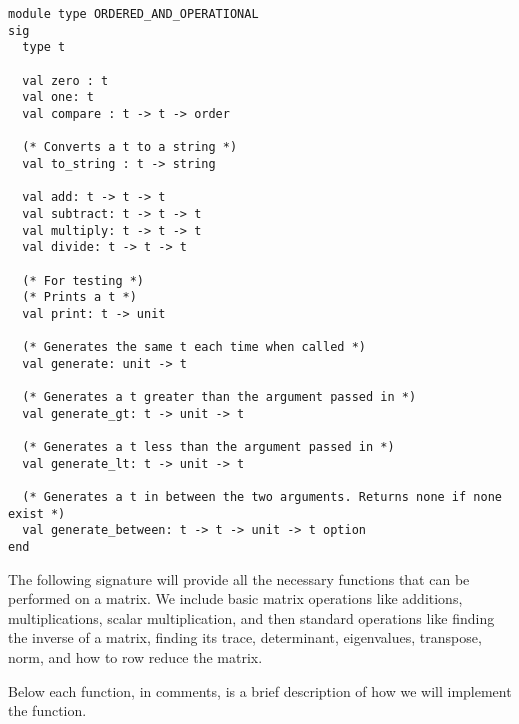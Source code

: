 \documentclass[letterpaper,11pt]{article}
\begin{document}
\begin{verbatim}
module type ORDERED_AND_OPERATIONAL
sig
  type t

  val zero : t
  val one: t
  val compare : t -> t -> order

  (* Converts a t to a string *)
  val to_string : t -> string

  val add: t -> t -> t
  val subtract: t -> t -> t
  val multiply: t -> t -> t
  val divide: t -> t -> t

  (* For testing *)
  (* Prints a t *)
  val print: t -> unit 

  (* Generates the same t each time when called *)
  val generate: unit -> t

  (* Generates a t greater than the argument passed in *)
  val generate_gt: t -> unit -> t

  (* Generates a t less than the argument passed in *)
  val generate_lt: t -> unit -> t

  (* Generates a t in between the two arguments. Returns none if none exist *)
  val generate_between: t -> t -> unit -> t option
end
\end{verbatim}

The following signature will provide all the necessary functions that can be
performed on a matrix. We include basic matrix operations like additions,
multiplications, scalar multiplication, and then standard operations like
finding the inverse of a matrix, finding its trace, determinant, eigenvalues,
transpose, norm, and how to row reduce the matrix. 

Below each function, in comments, is a brief description of how we will
implement the function. 
\end{document}
